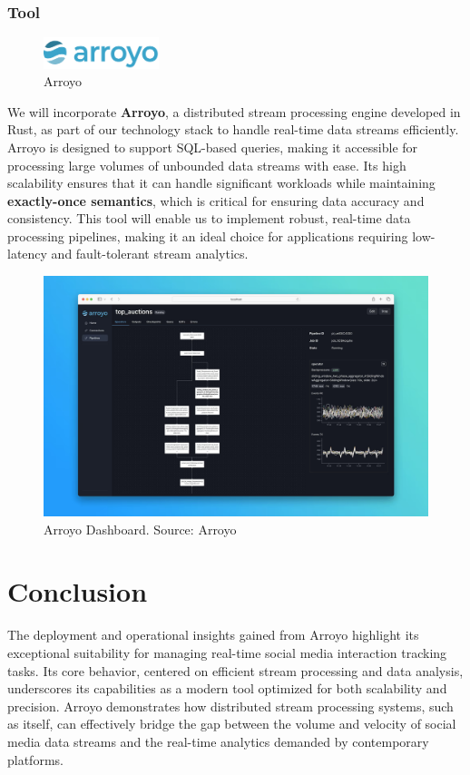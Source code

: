 \documentclass[12pt, a4paper]{article}
\begin{document}
        \subsubsection{Tool}
        \begin{figure}[H]
            \centering
            \includegraphics[width=0.3\textwidth]{Images/arroyo.png}
            \vspace{1em}
            \caption{Arroyo}
        \end{figure}
        We will incorporate \textbf{Arroyo}, a distributed stream processing engine developed in Rust, as part of our technology stack to handle real-time data streams efficiently. Arroyo is designed to support SQL-based queries, making it accessible for processing large volumes of unbounded data streams with ease. Its high scalability ensures that it can handle significant workloads while maintaining \textbf{exactly-once semantics}, which is critical for ensuring data accuracy and consistency. This tool will enable us to implement robust, real-time data processing pipelines, making it an ideal choice for applications requiring low-latency and fault-tolerant stream analytics.
        \begin{figure}[H]
            \centering
            \includegraphics[width=\textwidth]{Images/tool-dash.png}
            \vspace{1em}
            \caption{Arroyo Dashboard. Source: Arroyo}
        \end{figure}


\section{Conclusion}
The deployment and operational insights gained from Arroyo highlight its exceptional suitability for
managing real-time social media interaction tracking tasks. Its core behavior, centered on efficient
stream processing and data analysis, underscores its capabilities as a modern tool optimized for
both scalability and precision. Arroyo demonstrates how distributed stream processing systems, such
as itself, can effectively bridge the gap between the volume and velocity of social media data
streams and the real-time analytics demanded by contemporary platforms.
\end{document}
